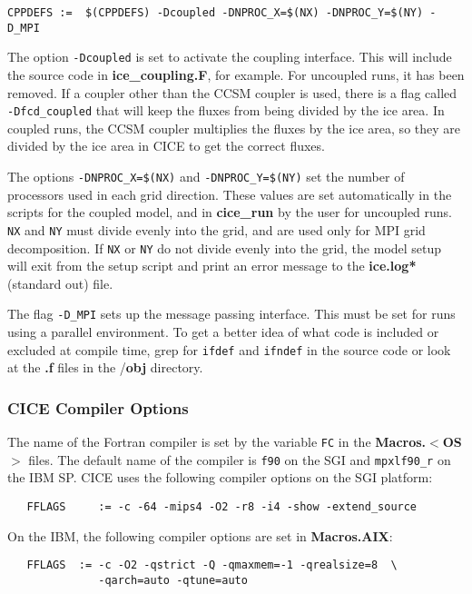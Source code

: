 \begin{verbatim}
CPPDEFS :=  $(CPPDEFS) -Dcoupled -DNPROC_X=$(NX) -DNPROC_Y=$(NY) -D_MPI
\end{verbatim}

The option {\tt -Dcoupled} is set to activate the coupling interface.  This 
will include the source code in {\bf ice\_coupling.F}, for example.  For uncoupled
runs, it has been removed.
If a coupler other than the CCSM coupler is used, there is a flag called
{\tt -Dfcd\_coupled} that will keep the fluxes from being divided by the ice area.
In coupled runs, the CCSM coupler multiplies the fluxes by the ice area, so
they are divided by the ice area in CICE to get the correct fluxes.

The options {\tt -DNPROC\_X=\$(NX)} and {\tt -DNPROC\_Y=\$(NY)} set the number of
processors used in each grid direction.  These values are set automatically
in the scripts for the coupled model, and in {\bf cice\_run} by the user for
uncoupled runs.  {\tt NX} and {\tt NY} must divide evenly into the grid, and
are used only for MPI grid decomposition.  If {\tt NX} or {\tt NY} do not divide evenly
into the grid, the model setup will exit from the setup script
and print an error message to the {\bf ice.log*} (standard out) file.

The flag {\tt -D\_MPI} sets up the message passing interface.  This must be set
for runs using a parallel environment.  To get a better idea of what code
is included or excluded at compile time, grep for {\tt ifdef} and {\tt ifndef}
in the source code or look at the {\bf *.f} files in the /{\bf obj} directory.

\subsubsection{CICE Compiler Options}

The name of the Fortran compiler is set by the variable {\tt FC} in the
{\bf Macros.$<$OS$>$} files.  The default name of the compiler is {\tt f90}
on the SGI and {\tt mpxlf90\_r} on the IBM SP.  CICE uses the following compiler
options on the SGI platform:

\begin{verbatim}
   FFLAGS     := -c -64 -mips4 -O2 -r8 -i4 -show -extend_source
\end{verbatim}

On the IBM, the following compiler options are set in {\bf Macros.AIX}:

\begin{verbatim}
   FFLAGS  := -c -O2 -qstrict -Q -qmaxmem=-1 -qrealsize=8  \
              -qarch=auto -qtune=auto
\end{verbatim}

